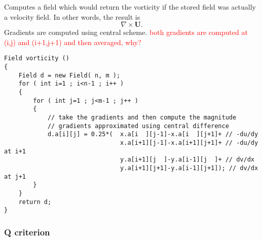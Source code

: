 \documentclass[notitlepage]{article}
\begin{document}
Computes a field which would return the vorticity if the stored
field was actually a velocity field. In other words, the result is
%
\begin{equation}
\nabla \times \mathbf{U}.
\end{equation}
%
Gradients are computed using central scheme.
\textcolor{red}{both gradients are computed at (i,j) and (i+1,j+1) and
then averaged, why?}

\begin{lstlisting}[style=myCpp]
Field vorticity ()
{
	Field d = new Field( n, m );
	for ( int i=1 ; i<n-1 ; i++ )
	{
		for ( int j=1 ; j<m-1 ; j++ )
		{
			// take the gradients and then compute the magnitude
			// gradients approximated using central difference
			d.a[i][j] = 0.25*(	x.a[i  ][j-1]-x.a[i  ][j+1]+ // -du/dy
								x.a[i+1][j-1]-x.a[i+1][j+1]+ // -du/dy at i+1
								y.a[i+1][j  ]-y.a[i-1][j  ]+ // dv/dx
								y.a[i+1][j+1]-y.a[i-1][j+1]); // dv/dx at j+1
		}
	}
	return d;
}
\end{lstlisting}

\subsubsection{Q criterion}
\end{document}
